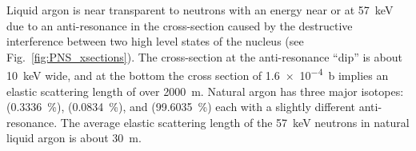 



Liquid argon is near transparent to neutrons with an energy near or at \SI{57}{\keV} due to an anti-resonance in the cross-section caused by the destructive interference between two high level states of the  nucleus (see Fig.~\ref{fig:PNS_xsections}). The cross-section at the anti-resonance ``dip'' is about \SI{10}{\keV} wide, and at the bottom the cross section of \SI{1.6e-4}{\barn} implies an elastic scattering length of over \SI{2000}{\m}. %
Natural argon has three major isotopes:  (\SI{0.3336}{\%}),  (\SI{0.0834}{\%}), and  (\SI{99.6035}{\%}) each with a slightly different anti-resonance. The average elastic scattering length of the \SI{57}{\keV} neutrons in natural liquid argon is about \SI{30}{\m}.

